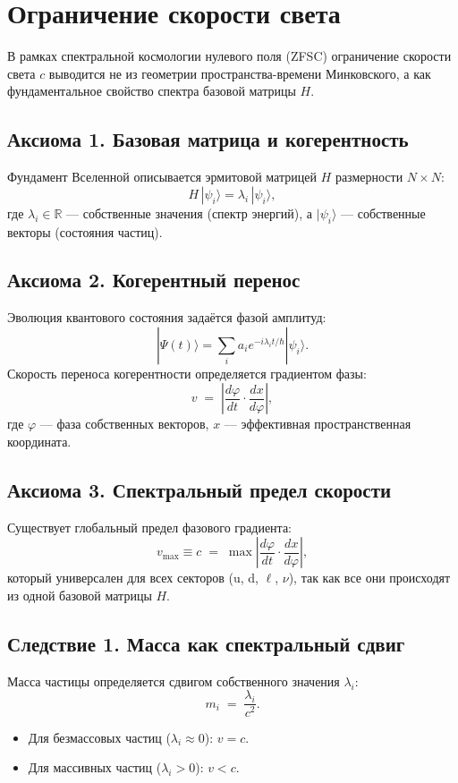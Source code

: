 \section{Ограничение скорости света}

В рамках спектральной космологии нулевого поля (ZFSC) ограничение скорости света $c$ выводится не из геометрии пространства-времени Минковского, а как фундаментальное свойство спектра базовой матрицы $H$.

\subsection*{Аксиома 1. Базовая матрица и когерентность}
Фундамент Вселенной описывается эрмитовой матрицей $H$ размерности $N \times N$:
\[
H \, | \psi_i \rangle = \lambda_i \, | \psi_i \rangle ,
\]
где $\lambda_i \in \mathbb{R}$ — собственные значения (спектр энергий), а $|\psi_i\rangle$ — собственные векторы (состояния частиц).

\subsection*{Аксиома 2. Когерентный перенос}
Эволюция квантового состояния задаётся фазой амплитуд:
\[
|\Psi(t)\rangle = \sum_i a_i e^{-i\lambda_i t/\hbar} |\psi_i\rangle .
\]
Скорость переноса когерентности определяется градиентом фазы:
\[
v \;=\; \left| \frac{d\varphi}{dt} \cdot \frac{dx}{d\varphi} \right|,
\]
где $\varphi$ — фаза собственных векторов, $x$ — эффективная пространственная координата.

\subsection*{Аксиома 3. Спектральный предел скорости}
Существует глобальный предел фазового градиента:
\[
v_{\max} \equiv c \;=\; \max \left| \frac{d\varphi}{dt} \cdot \frac{dx}{d\varphi} \right| ,
\]
который универсален для всех секторов (u, d, $\ell$, $\nu$), так как все они происходят из одной базовой матрицы $H$.

\subsection*{Следствие 1. Масса как спектральный сдвиг}
Масса частицы определяется сдвигом собственного значения $\lambda_i$:
\[
m_i \;=\; \frac{\lambda_i}{c^2}.
\]
\begin{itemize}
  \item Для безмассовых частиц ($\lambda_i \approx 0$): $v = c$.
  \item Для массивных частиц ($\lambda_i > 0$): $v < c$.
\end{itemize}

